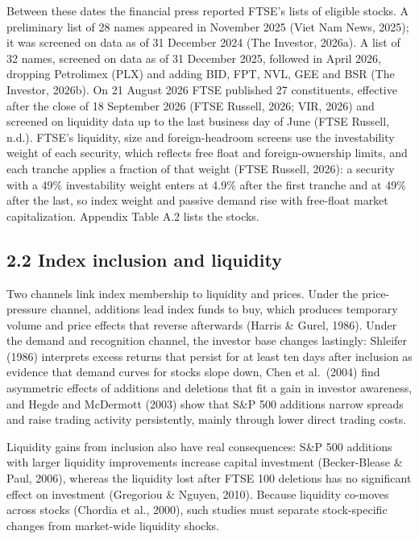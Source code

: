 \documentclass[review,authoryear,12pt]{elsarticle}
\begin{document}
Between these dates the financial press reported FTSE's lists of
eligible stocks. A preliminary list of 28 names appeared in November
2025 (Viet Nam News, 2025); it was screened on data as of 31 December
2024 (The Investor, 2026a). A list of 32 names, screened on data as of
31 December 2025, followed in April 2026, dropping Petrolimex (PLX) and
adding BID, FPT, NVL, GEE and BSR (The Investor, 2026b). On 21 August
2026 FTSE published 27 constituents, effective after the close of 18
September 2026 (FTSE Russell, 2026; VIR, 2026) and screened on liquidity
data up to the last business day of June (FTSE Russell, n.d.). FTSE's
liquidity, size and foreign-headroom screens use the investability
weight of each security, which reflects free float and foreign-ownership
limits, and each tranche applies a fraction of that weight (FTSE
Russell, 2026): a security with a 49\% investability weight enters at
4.9\% after the first tranche and at 49\% after the last, so index
weight and passive demand rise with free-float market capitalization.
Appendix Table A.2 lists the stocks.

\hypertarget{index-inclusion-and-liquidity}{%
\subsection*{2.2 Index inclusion and
liquidity}}

Two channels link index membership to liquidity and prices. Under the
price-pressure channel, additions lead index funds to buy, which
produces temporary volume and price effects that reverse afterwards
(Harris \& Gurel, 1986). Under the demand and recognition channel, the
investor base changes lastingly: Shleifer (1986) interprets excess
returns that persist for at least ten days after inclusion as evidence
that demand curves for stocks slope down, Chen et al.~(2004) find
asymmetric effects of additions and deletions that fit a gain in
investor awareness, and Hegde and McDermott (2003) show that S\&P 500
additions narrow spreads and raise trading activity persistently, mainly
through lower direct trading costs.

Liquidity gains from inclusion also have real consequences: S\&P 500
additions with larger liquidity improvements increase capital investment
(Becker-Blease \& Paul, 2006), whereas the liquidity lost after FTSE 100
deletions has no significant effect on investment (Gregoriou \& Nguyen,
2010). Because liquidity co-moves across stocks (Chordia et al., 2000),
such studies must separate stock-specific changes from market-wide
liquidity shocks.
\end{document}
